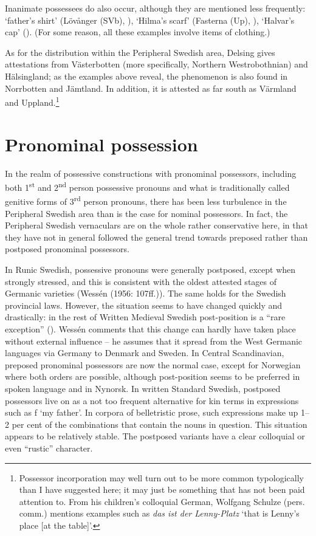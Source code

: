 Inanimate possessees do also occur, although they are mentioned less frequently:  ‘father’s shirt’ (Lövånger (SVb), \citealt{Holm1942}),  ‘Hilma’s scarf’ (Fasterna (Up), \citealt[134]{Tiselius1902}),  ‘Halvar’s cap’ (\citealt{Oscarsson2007}). (For some reason, all these examples involve items of clothing.)

As for the distribution within the Peripheral Swedish area, Delsing gives attestations from Västerbotten (more specifically, Northern Westrobothnian) and Hälsingland; as the examples above reveal, the phenomenon is also found in Norrbotten and Jämtland. In addition, it is attested as far south as Värmland and Uppland.\footnote{ Possessor incorporation may well turn out to be more common typologically than I have suggested here; it may just be something that has not been paid attention to. From his children’s colloquial German, Wolfgang Schulze (pers. comm.) mentions examples such as \textit{das ist der Lenny-Platz} ‘that is Lenny’s place [at the table]’.\par }

\section{Pronominal possession}

In the realm of possessive constructions with pronominal possessors, including both 1\textsuperscript{st} and 2\textsuperscript{nd} person possessive pronouns and what is traditionally called genitive forms of 3\textsuperscript{rd} person pronouns, there has been less turbulence in the Peripheral Swedish area than is the case for nominal possessors. In fact, the Peripheral Swedish vernaculars are on the whole rather conservative here, in that they have not in general followed the general trend towards preposed rather than postposed pronominal possessors. 

In Runic Swedish, possessive pronouns were generally postposed, except when strongly stressed, and this is consistent with the oldest attested stages of Germanic varieties (Wessén (1956: 107ff.)). The same holds for the Swedish provincial laws. However, the situation seems to have changed quickly and drastically: in the rest of Written Medieval Swedish post-position is a “rare exception” (\citealt[110ff.]{Wessén1956}). Wessén comments that this change can hardly have taken place without external influence – he assumes that it spread from the West Germanic languages via Germany to Denmark and Sweden. In Central Scandinavian, preposed pronominal possessors are now the normal case, except for Norwegian where both orders are possible, although post-position seems to be preferred in spoken language and in Nynorsk. In written Standard Swedish, postposed possessors live on as a not too frequent alternative for kin terms in expressions such as f ‘my father’. In corpora of belletristic prose, such expressions make up 1--2 per cent of the combinations that contain the nouns in question. This situation appears to be relatively stable. The postposed variants have a clear colloquial or even “rustic” character. 

